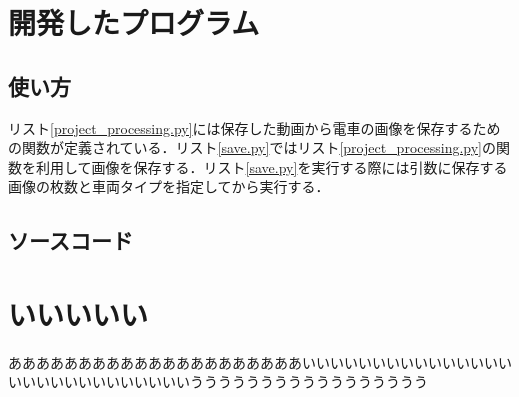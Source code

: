 

\appendix %
\chapter{開発したプログラム}
\section{使い方}
リスト\ref{project_processing.py}には保存した動画から電車の画像を保存するための関数が定義されている．リスト\ref{save.py}ではリスト\ref{project_processing.py}の関数を利用して画像を保存する．リスト\ref{save.py}を実行する際には引数に保存する画像の枚数と車両タイプを指定してから実行する．

\section{ソースコード}
%




\chapter{いいいいい}
あああああああああああああああああああああいいいいいいいいいいいいいいいいいいいいいいいいいいいいううううううううううううううううう
